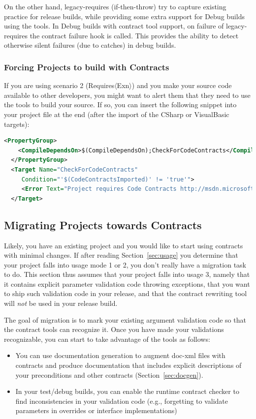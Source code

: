 \documentclass{article}
\newcommand{\requiresn}[1]{{Requires}$\langle$#1$\rangle$}
\begin{document}
On the other hand, legacy-requires (if-then-throw) try to capture
existing practice for release builds, while providing some extra
support for Debug builds using the tools. In Debug builds with
contract tool support, on failure of legacy-requires
the contract failure hook is called. This provides the ability to
detect otherwise silent failures (due to catches) in debug builds. 

\subsubsection{Forcing Projects to build with Contracts}
If you are using scenario 2 (\requiresn{Exn}) and you make your source
code available to other developers, you might want to alert them that
they need to use the tools to build your source. If so, you can insert
the following snippet into your project file at the end (after the
import of the CSharp or VisualBasic targets):
\begin{lstlisting}[language=XML,mathescape=false]
  <PropertyGroup>
    <CompileDependsOn>$(CompileDependsOn);CheckForCodeContracts</CompileDependsOn>
  </PropertyGroup>
  <Target Name="CheckForCodeContracts"
     Condition="'$(CodeContractsImported)' != 'true'">
     <Error Text="Project requires Code Contracts http://msdn.microsoft.com/en-us/devlabs/dd491992.aspx"/>
  </Target>
\end{lstlisting}

\subsection{Migrating Projects towards Contracts}
\label{sec:migration}
Likely, you have an existing project and you would like to start using
contracts with minimal changes. If after reading
Section~\ref{sec:usage} you determine that your project falls into
usage mode 1 or 2, you don't really have a migration task to do. This
section thus assumes that your project falls into usage 3, namely that it
contains explicit parameter validation code throwing exceptions, that
you want to ship such validation code in your release, and that the
contract rewriting tool will \emph{not} be used in your release build.

The goal of migration is to mark your existing argument validation
code so that the contract tools can recognize it. Once you have made
your validations recognizable, you can start to take advantage of the
tools as follows:
\begin{itemize}
\item You can use documentation generation to augment doc-xml files
  with contracts and produce documentation that includes explicit
  descriptions of your preconditions and other contracts (Section~\ref{sec:docgen}).
\item In your test/debug builds, you can enable the runtime contract
  checker to find inconsistencies in your
validation code (e.g., forgetting to validate parameters in overrides
or interface implementations)
\end{itemize}
\end{document}
